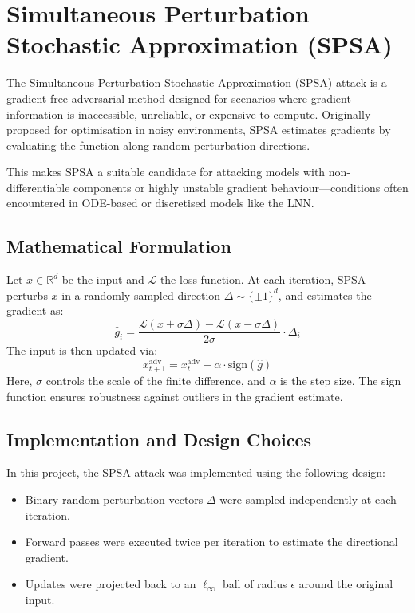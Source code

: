 \section{Simultaneous Perturbation Stochastic Approximation (SPSA)}

The Simultaneous Perturbation Stochastic Approximation (SPSA) attack is a gradient-free adversarial method designed for scenarios where gradient information is inaccessible, unreliable, or expensive to compute. Originally proposed for optimisation in noisy environments, SPSA estimates gradients by evaluating the function along random perturbation directions.

This makes SPSA a suitable candidate for attacking models with non-differentiable components or highly unstable gradient behaviour—conditions often encountered in ODE-based or discretised models like the LNN.

\subsection{Mathematical Formulation}
Let $x \in \mathbb{R}^d$ be the input and $\mathcal{L}$ the loss function. At each iteration, SPSA perturbs $x$ in a randomly sampled direction $\Delta \sim \{\pm 1\}^d$, and estimates the gradient as:
\[
\hat{g}_i = \frac{\mathcal{L}(x + \sigma \Delta) - \mathcal{L}(x - \sigma \Delta)}{2 \sigma} \cdot \Delta_i
\]
The input is then updated via:
\[
x^{\text{adv}}_{t+1} = x^{\text{adv}}_t + \alpha \cdot \text{sign}(\hat{g})
\]
Here, $\sigma$ controls the scale of the finite difference, and $\alpha$ is the step size. The sign function ensures robustness against outliers in the gradient estimate.

\subsection{Implementation and Design Choices}
In this project, the SPSA attack was implemented using the following design:
\begin{itemize}
    \item Binary random perturbation vectors $\Delta$ were sampled independently at each iteration.
    \item Forward passes were executed twice per iteration to estimate the directional gradient.
    \item Updates were projected back to an $\ell_\infty$ ball of radius $\epsilon$ around the original input.
\end{itemize}

